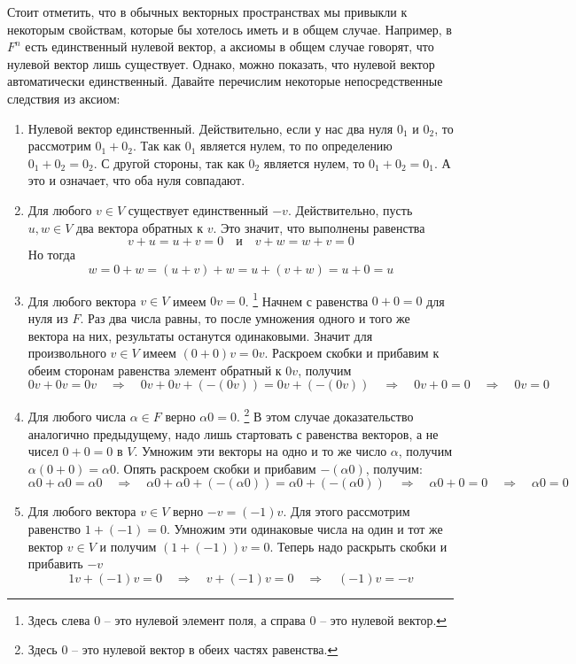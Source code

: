 Стоит отметить, что в обычных векторных пространствах мы привыкли к некоторым свойствам, которые бы хотелось иметь и в общем случае.
Например, в $F^n$ есть единственный нулевой вектор, а аксиомы в общем случае говорят, что нулевой вектор лишь существует.
Однако, можно показать, что нулевой вектор автоматически единственный.
Давайте перечислим некоторые непосредственные следствия из аксиом:
\begin{enumerate}
\item Нулевой вектор единственный.
Действительно, если у нас два нуля $0_1$ и $0_2$, то рассмотрим $0_1 + 0_2$.
Так как $0_1$ является нулем, то по определению $0_1 + 0_2 = 0_2$.
С другой стороны, так как $0_2$ является нулем, то $0_1 + 0_2 = 0_1$.
А это и означает, что оба нуля совпадают.

\item Для любого $v\in V$ существует единственный $-v$.
Действительно, пусть $u, w\in V$ два вектора обратных к $v$.
Это значит, что выполнены равенства
\[
v + u = u + v = 0 \quad\text{и}\quad v + w = w + v = 0
\]
Но тогда
\[
w = 0 + w = (u + v) + w = u + (v + w) = u + 0 = u
\]

\item Для любого вектора $v\in V$ имеем $0 v = 0$.%
\footnote{Здесь слева $0$ -- это нулевой элемент поля, а справа $0$ -- это нулевой вектор.}
Начнем с равенства $0 + 0 = 0$ для нуля из $F$.
Раз два числа равны, то после умножения одного и того же вектора на них, результаты останутся одинаковыми.
Значит для произвольного $v\in V$ имеем $(0 + 0) v = 0 v$.
Раскроем скобки и прибавим к обеим сторонам равенства элемент обратный к $0 v$, получим
\[
0 v + 0 v = 0v \quad\Rightarrow\quad 0 v + 0 v + (-(0v)) = 0v + (-(0v))\quad\Rightarrow\quad 0v + 0 = 0 \quad\Rightarrow\quad 0 v = 0
\]

\item Для любого числа $\alpha \in F$ верно $\alpha 0 = 0$.%
\footnote{Здесь $0$ -- это нулевой вектор в обеих частях равенства.}
В этом случае доказательство аналогично предыдущему, надо лишь стартовать с равенства векторов, а не чисел $0 + 0 = 0$ в $V$.
Умножим эти векторы на одно и то же число $\alpha$, получим $\alpha(0 + 0) = \alpha 0$.
Опять раскроем скобки и прибавим $- (\alpha 0)$, получим:
\[
\alpha 0 + \alpha 0 = \alpha 0 \quad \Rightarrow\quad
\alpha 0 + \alpha 0 + (-(\alpha 0)) = \alpha 0 + (-(\alpha 0))\quad \Rightarrow\quad
\alpha 0 + 0 = 0 \quad \Rightarrow\quad \alpha 0 = 0
\]

\item Для любого вектора $v\in V$ верно $-v = (-1)v$.
Для этого рассмотрим равенство $1 + (-1) = 0$.
Умножим эти одинаковые числа на один и тот же вектор $v\in V$ и получим $(1 + (-1))v = 0$.
Теперь надо раскрыть скобки и прибавить $-v$
\[
1 v + (-1) v = 0\quad \Rightarrow \quad v + (-1) v = 0 \quad \Rightarrow \quad (-1) v = -v
\]
\end{enumerate}
